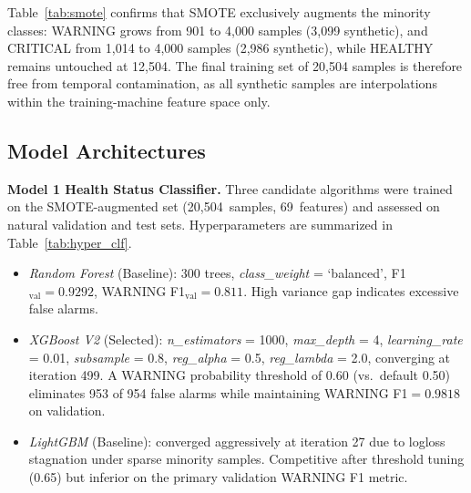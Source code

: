\documentclass[conference]{IEEEtran}
\begin{document}
Table~\ref{tab:smote} confirms that SMOTE exclusively augments the minority classes: WARNING grows from 901 to 4,000 samples (3,099 synthetic), and CRITICAL from 1,014 to 4,000 samples (2,986 synthetic), while HEALTHY remains untouched at 12,504. The final training set of 20,504 samples is therefore free from temporal contamination, as all synthetic samples are interpolations within the training-machine feature space only.


\subsection{Model Architectures}
\textbf{Model 1   Health Status Classifier.}
Three candidate algorithms were trained on the SMOTE-augmented set
(20,504~samples, 69~features) and assessed on natural validation and test
sets. Hyperparameters are summarized in Table~\ref{tab:hyper_clf}.

\begin{itemize}
\item \textit{Random Forest} (Baseline): 300 trees,
  \textit{class\_weight} = `balanced', F1$_\text{val}=0.9292$, WARNING
  F1$_\text{val}=0.811$. High variance gap indicates excessive false alarms.

\item \textit{XGBoost V2} (Selected): \textit{n\_estimators} = 1000,
  \textit{max\_depth} = 4, \textit{learning\_rate} = 0.01,
  \textit{subsample} = 0.8, \textit{reg\_alpha} = 0.5, \textit{reg\_lambda} = 2.0,
  converging at iteration 499. A WARNING probability threshold of 0.60
  (vs.\ default 0.50) eliminates 953 of 954 false alarms while maintaining
  WARNING F1$=0.9818$ on validation.

\item \textit{LightGBM} (Baseline): converged aggressively at iteration 27
  due to logloss stagnation under sparse minority samples. Competitive after
  threshold tuning (0.65) but inferior on the primary validation WARNING F1
  metric.
\end{itemize}
\end{document}
